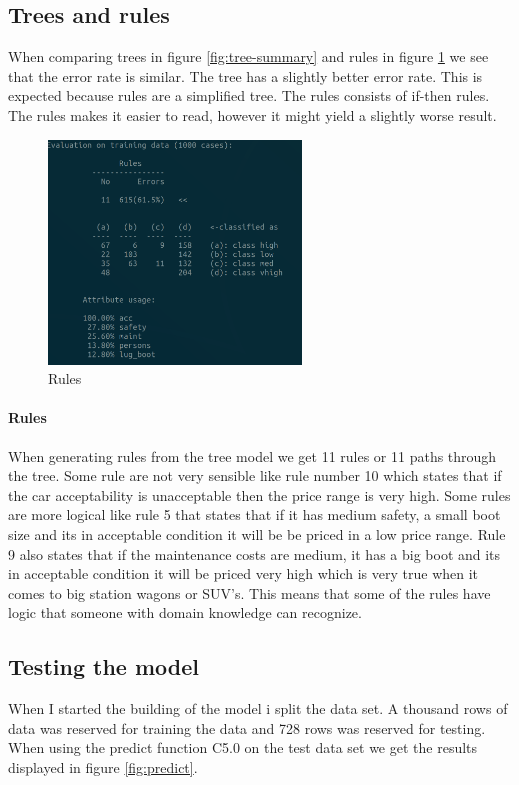 \documentclass[a4paper, 12pt]{article}
\begin{document}
  \subsection{Trees and rules}
  When comparing trees in figure \ref{fig:tree-summary} and rules in figure \ref{fig:rules} we see that the error rate is similar. The tree has a slightly better error rate. This is expected because rules are a simplified tree. The rules consists of if-then rules. The rules makes it easier to read, however it might yield a slightly worse result.
  \begin{figure}[h]
    \centering 
    \includegraphics[width=0.6\textwidth]
    {images/summary-rules}
    \caption{Rules}
    \label{fig:rules}
  \end{figure}

  \paragraph{Rules}
  When generating rules from the tree model we get 11 rules or 11 paths through the tree. Some rule are not very sensible like rule number 10 which states that if the car acceptability is unacceptable then the price range is very high. Some rules are more logical like rule 5 that states that if it has medium safety, a small boot size and its in acceptable condition it will be be priced in a low price range.
  Rule 9 also states that if the maintenance costs are medium, it has a big boot and its in acceptable condition it will be priced very high which is very true when it comes to big station wagons or SUV's. This means that some of the rules have logic that someone with domain knowledge can recognize.

  \subsection{Testing the model}
  When I started the building of the model i split the data set. A thousand rows of data was reserved for training the data and 728 rows was reserved for testing. When using the predict function C5.0 on the test data set we get the results displayed in figure \ref{fig:predict}.
\end{document}
